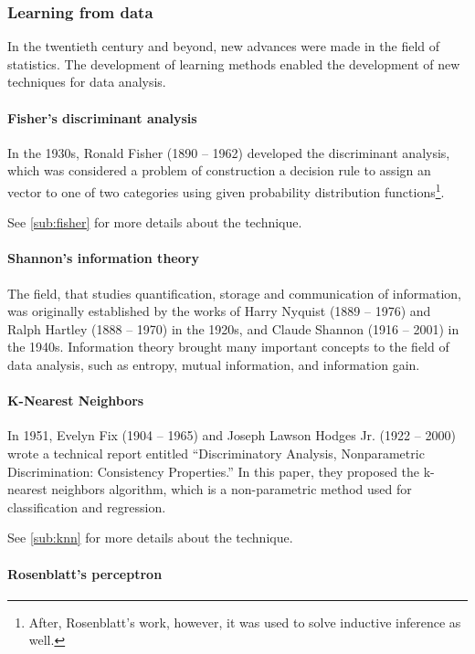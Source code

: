 \subsubsection{Learning from data}

In the twentieth century and beyond, new advances were made in the field of statistics.  The
development of learning methods enabled the development of new techniques for
data analysis.

\paragraph{Fisher's discriminant analysis}

In the 1930s, Ronald Fisher (1890 -- 1962) developed the discriminant analysis, which was
considered a problem of construction a decision rule to assign an vector to one of two
categories using given probability distribution functions\footnote{After, Rosenblatt's work,
however, it was used to solve inductive inference as well.}.

See \cref{sub:fisher} for more details about the technique.

\paragraph{Shannon's information theory}

The field, that studies quantification, storage and communication of information, was
originally established by the works of Harry Nyquist (1889 -- 1976) and Ralph Hartley
(1888 -- 1970) in the 1920s, and Claude Shannon (1916 -- 2001) in the 1940s.
Information theory brought many important concepts to the field of data analysis, such as
entropy, mutual information, and information gain.

\paragraph{K-Nearest Neighbors}

In 1951, Evelyn Fix (1904 -- 1965) and Joseph Lawson Hodges Jr. (1922 -- 2000) wrote a
technical report entitled ``Discriminatory Analysis, Nonparametric Discrimination:
Consistency Properties.''  In this paper, they proposed the k-nearest neighbors algorithm,
which is a non-parametric method used for classification and regression.

See \cref{sub:knn} for more details about the technique.

\paragraph{Rosenblatt's perceptron}

